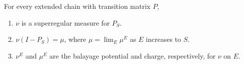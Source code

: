 For every extended chain with transition matrix $P$,
\begin{enumerate}
\item $\nu$ is a superregular measure for $P_S$.
\item $\nu(I - P_S) = \mu$, where $\mu = \lim_E \mu^E$ as $E$ increases to $S$.
\item $\nu^E$ and $\mu^E$ are the balayage potential and charge, respectively, for $\nu$ on $E$.
\end{enumerate}
